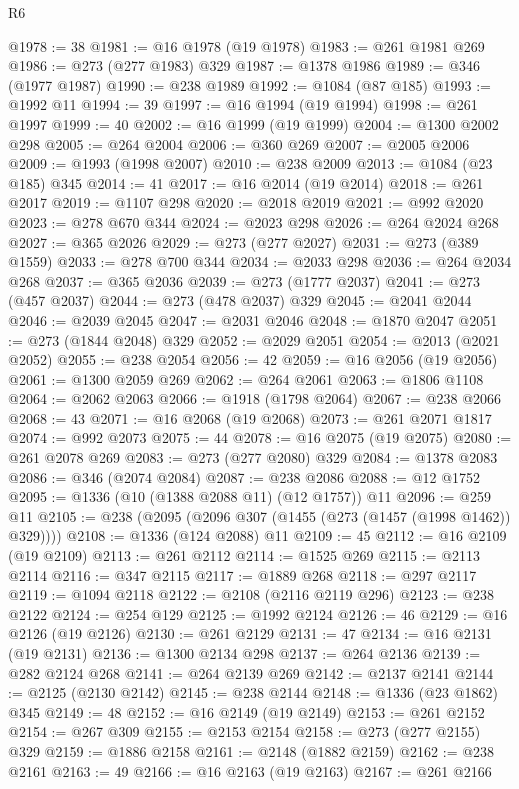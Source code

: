 \begin{lexlean}{R6}
\begin{coremodule}
{{{{{{{{{{{{{{{{{{{@1978 := 38
@1981 := @16 @1978 (@19 @1978)
@1983 := @261 @1981 @269
@1986 := @273 (@277 @1983) @329
@1987 := @1378 @1986
@1989 := @346 (@1977 @1987)
@1990 := @238 @1989
@1992 := @1084 (@87 @185)
@1993 := @1992 @11
@1994 := 39
@1997 := @16 @1994 (@19 @1994)
@1998 := @261 @1997
@1999 := 40
@2002 := @16 @1999 (@19 @1999)
@2004 := @1300 @2002 @298
@2005 := @264 @2004
@2006 := @360 @269
@2007 := @2005 @2006
@2009 := @1993 (@1998 @2007)
@2010 := @238 @2009
@2013 := @1084 (@23 @185) @345
@2014 := 41
@2017 := @16 @2014 (@19 @2014)
@2018 := @261 @2017
@2019 := @1107 @298
@2020 := @2018 @2019
@2021 := @992 @2020
@2023 := @278 @670 @344
@2024 := @2023 @298
@2026 := @264 @2024 @268
@2027 := @365 @2026
@2029 := @273 (@277 @2027)
@2031 := @273 (@389 @1559)
@2033 := @278 @700 @344
@2034 := @2033 @298
@2036 := @264 @2034 @268
@2037 := @365 @2036
@2039 := @273 (@1777 @2037)
@2041 := @273 (@457 @2037)
@2044 := @273 (@478 @2037) @329
@2045 := @2041 @2044
@2046 := @2039 @2045
@2047 := @2031 @2046
@2048 := @1870 @2047
@2051 := @273 (@1844 @2048) @329
@2052 := @2029 @2051
@2054 := @2013 (@2021 @2052)
@2055 := @238 @2054
@2056 := 42
@2059 := @16 @2056 (@19 @2056)
@2061 := @1300 @2059 @269
@2062 := @264 @2061
@2063 := @1806 @1108
@2064 := @2062 @2063
@2066 := @1918 (@1798 @2064)
@2067 := @238 @2066
@2068 := 43
@2071 := @16 @2068 (@19 @2068)
@2073 := @261 @2071 @1817
@2074 := @992 @2073
@2075 := 44
@2078 := @16 @2075 (@19 @2075)
@2080 := @261 @2078 @269
@2083 := @273 (@277 @2080) @329
@2084 := @1378 @2083
@2086 := @346 (@2074 @2084)
@2087 := @238 @2086
@2088 := @12 @1752
@2095 := @1336 (@10 (@1388 @2088 @11) (@12 @1757)) @11
@2096 := @259 @11
@2105 := @238 (@2095 (@2096 @307 (@1455 (@273 (@1457 (@1998 @1462)) @329))))
@2108 := @1336 (@124 @2088) @11
@2109 := 45
@2112 := @16 @2109 (@19 @2109)
@2113 := @261 @2112
@2114 := @1525 @269
@2115 := @2113 @2114
@2116 := @347 @2115
@2117 := @1889 @268
@2118 := @297 @2117
@2119 := @1094 @2118
@2122 := @2108 (@2116 @2119 @296)
@2123 := @238 @2122
@2124 := @254 @129
@2125 := @1992 @2124
@2126 := 46
@2129 := @16 @2126 (@19 @2126)
@2130 := @261 @2129
@2131 := 47
@2134 := @16 @2131 (@19 @2131)
@2136 := @1300 @2134 @298
@2137 := @264 @2136
@2139 := @282 @2124 @268
@2141 := @264 @2139 @269
@2142 := @2137 @2141
@2144 := @2125 (@2130 @2142)
@2145 := @238 @2144
@2148 := @1336 (@23 @1862) @345
@2149 := 48
@2152 := @16 @2149 (@19 @2149)
@2153 := @261 @2152
@2154 := @267 @309
@2155 := @2153 @2154
@2158 := @273 (@277 @2155) @329
@2159 := @1886 @2158
@2161 := @2148 (@1882 @2159)
@2162 := @238 @2161
@2163 := 49
@2166 := @16 @2163 (@19 @2163)
@2167 := @261 @2166
}}}}}}}}}}}}}}}}}}}
\end{coremodule}
\end{lexlean}
